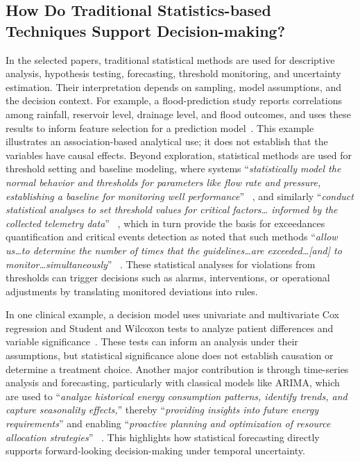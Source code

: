 \documentclass{sfuthesis}
\begin{document}
\subsection{How Do Traditional Statistics-based Techniques Support Decision-making?}
In the selected papers, traditional statistical methods are used for descriptive analysis, hypothesis testing, forecasting, threshold monitoring, and uncertainty estimation. Their interpretation depends on sampling, model assumptions, and the decision context. For example, a flood-prediction study reports correlations among rainfall, reservoir level, drainage level, and flood outcomes, and uses these results to inform feature selection for a prediction model~\cite{sreepathy2023design}. This example illustrates an association-based analytical use; it does not establish that the variables have causal effects.
Beyond exploration, statistical methods are used for threshold setting and baseline modeling, where systems “\textit{statistically model the normal behavior and thresholds for parameters like flow rate and pressure, establishing a baseline for monitoring well performance}” ~\cite{ataei2024intelligent}, and similarly “\textit{conduct statistical analyses to set threshold values for critical factors… informed by the collected telemetry data}” ~\cite{ataei2024intelligent}, which in turn provide the basis for exceedances quantification and critical events detection as noted that such methods “\textit{allow us…to determine the number of times that the guidelines…are exceeded…[and] to monitor…simultaneously}” ~\cite{cavieres_methodology_2020}. These statistical analyses for violations from thresholds can trigger decisions such as alarms, interventions, or operational adjustments by translating monitored deviations into rules.\par
In one clinical example, a decision model uses univariate and multivariate Cox regression and Student and Wilcoxon tests to analyze patient differences and variable significance~\cite{wang2023data}. These tests can inform an analysis under their assumptions, but statistical significance alone does not establish causation or determine a treatment choice.
Another major contribution is through time-series analysis and forecasting, particularly with classical models like ARIMA, which are used to “\textit{analyze historical energy consumption patterns, identify trends, and capture seasonality effects,}” thereby “\textit{providing insights into future energy requirements}” and enabling “\textit{proactive planning and optimization of resource allocation strategies}” ~\cite{krishnan2024data}. This highlights how statistical forecasting directly supports forward-looking decision-making under temporal uncertainty.\par
\end{document}

